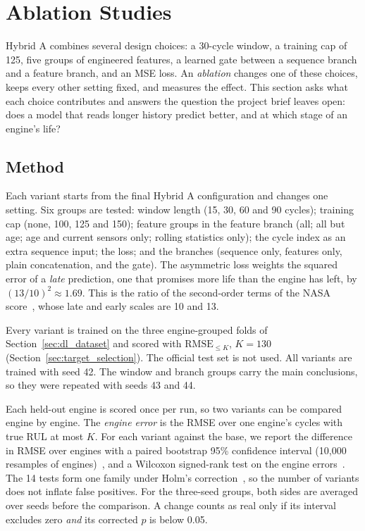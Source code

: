 
\section{Ablation Studies}
\label{sec:ablations}

Hybrid A combines several design choices: a 30-cycle window, a training cap
of 125, five groups of engineered features, a learned gate between a sequence
branch and a feature branch, and an MSE loss. An \emph{ablation} changes one
of these choices, keeps every other setting fixed, and measures the effect.
This section asks what each choice contributes and answers the question the
project brief leaves open: does a model that reads longer history predict
better, and at which stage of an engine's life?

\subsection{Method}
Each variant starts from the final Hybrid A configuration and changes one
setting. Six groups are tested: window length (15, 30, 60 and 90 cycles);
training cap (none, 100, 125 and 150); feature groups in the feature branch
(all; all but age; age and current sensors only; rolling statistics only);
the cycle index as an extra sequence input; the loss; and the branches
(sequence only, features only, plain concatenation, and the gate). The
asymmetric loss weights the squared error of a \emph{late} prediction, one
that promises more life than the engine has left, by $(13/10)^2\approx1.69$.
This is the ratio of the second-order terms of the NASA
score~\cite{Saxena2008damage}, whose late and early scales are 10 and 13.

Every variant is trained on the three engine-grouped folds of
Section~\ref{sec:dl_dataset} and scored with $\mathrm{RMSE}_{\leq K}$, $K=130$
(Section~\ref{sec:target_selection}). The official test set is not used. All
variants are trained with seed 42. The window and branch groups carry the
main conclusions, so they were repeated with seeds 43 and 44.

Each held-out engine is scored once per run, so two variants can be compared
engine by engine. The \emph{engine error} is the RMSE over one engine's
cycles with true RUL at most $K$. For each variant against the base, we
report the difference in RMSE over engines with a paired bootstrap 95\%
confidence interval (10{,}000 resamples of engines)~\cite{Efron1993introduction},
and a Wilcoxon signed-rank test on the engine errors~\cite{Wilcoxon1945individual}.
The 14 tests form one family under Holm's correction~\cite{Holm1979simple},
so the number of variants does not inflate false positives. For the
three-seed groups, both sides are averaged over seeds before the comparison.
A change counts as real only if its interval excludes zero \emph{and} its
corrected $p$ is below 0.05.

